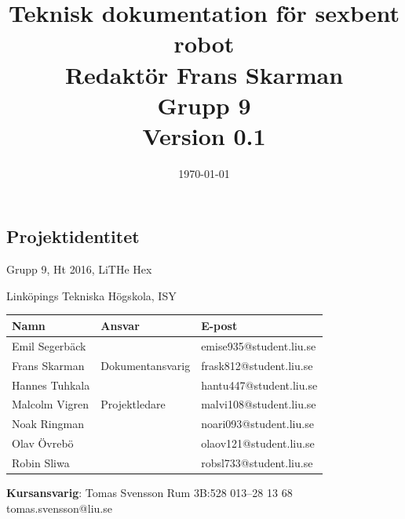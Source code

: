 \documentclass[a4paper,titlepage,12pt]{article}
\begin{document}
\listoftodos
	\title{\LARGE
		\textbf{Teknisk dokumentation för sexbent robot} \\
		\vspace*{0.5\baselineskip}
		\large
		Redaktör Frans Skarman \\
		Grupp 9 \\
		\small
		\vspace*{0.5\baselineskip}
		Version 0.1}

	\date{\today}

	\maketitle
	
	\newpage
	
	\begin{center}


		\section*{Projektidentitet}
		Grupp 9, Ht 2016, LiTHe Hex

		Linköpings Tekniska Högskola, ISY

		\renewcommand*{\arraystretch}{1.4}
		\begin{longtable}[c]{ l l l }
			\textbf{Namn} & \textbf{Ansvar} & \textbf{E-post} \\ \midrule
			Emil Segerbäck & & emise935@student.liu.se \\ \midrule
			Frans Skarman & Dokumentansvarig & frask812@student.liu.se \\ \midrule
			Hannes Tuhkala & & hantu447@student.liu.se \\ \midrule
			Malcolm Vigren & Projektledare & malvi108@student.liu.se \\ \midrule
			Noak Ringman &  & noari093@student.liu.se \\ \midrule
			Olav Övrebö &  & olaov121@student.liu.se \\ \midrule
			Robin Sliwa &  & robsl733@student.liu.se \\
		\end{longtable}

		\centering
		\textbf{Kursansvarig}: Tomas Svensson Rum 3B:528 013--28 13 68 tomas.svensson@liu.se

		\newpage
		\tableofcontents
		\newpage



\end{center}
\end{document}
